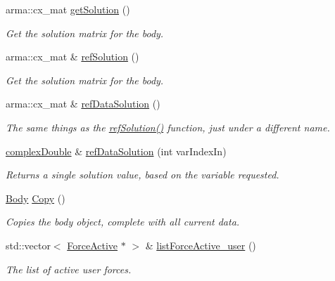 \begin{DoxyCompactItemize}
arma\-::cx\-\_\-mat \hyperlink{classosea_1_1ofreq_1_1_body_a5153b4cfad5bf12ae6f279a5e7190c31}{get\-Solution} ()
\begin{DoxyCompactList}\small\item\em Get the solution matrix for the body. \end{DoxyCompactList}\item 
arma\-::cx\-\_\-mat \& \hyperlink{classosea_1_1ofreq_1_1_body_ae799af5531c35381830061f6abc0bb17}{ref\-Solution} ()
\begin{DoxyCompactList}\small\item\em Get the solution matrix for the body. \end{DoxyCompactList}\item 
arma\-::cx\-\_\-mat \& \hyperlink{classosea_1_1ofreq_1_1_body_af22d8750d2ce8a85c4896a0261569f63}{ref\-Data\-Solution} ()
\begin{DoxyCompactList}\small\item\em The same things as the \hyperlink{classosea_1_1ofreq_1_1_body_ae799af5531c35381830061f6abc0bb17}{ref\-Solution()} function, just under a different name. \end{DoxyCompactList}\item 
\hyperlink{namespaceosea_1_1ofreq_a40cad4695a41123a7ae6ab0b6e8b1664}{complex\-Double} \& \hyperlink{classosea_1_1ofreq_1_1_body_a5459de639385a8a5dd32a5591aabeee9}{ref\-Data\-Solution} (int var\-Index\-In)
\begin{DoxyCompactList}\small\item\em Returns a single solution value, based on the variable requested. \end{DoxyCompactList}\item 
\hyperlink{classosea_1_1ofreq_1_1_body}{Body} \hyperlink{classosea_1_1ofreq_1_1_body_a370dc9a5702d93d9295a9618ebdef456}{Copy} ()
\begin{DoxyCompactList}\small\item\em Copies the body object, complete with all current data. \end{DoxyCompactList}\item 
std\-::vector$<$ \hyperlink{classosea_1_1ofreq_1_1_force_active}{Force\-Active} $\ast$ $>$ \& \hyperlink{classosea_1_1ofreq_1_1_body_ab9373ca18d09e89a2ba535c66fa92760}{list\-Force\-Active\-\_\-user} ()
\begin{DoxyCompactList}\small\item\em The list of active user forces. \end{DoxyCompactList}\item 

\end{DoxyCompactItemize}
